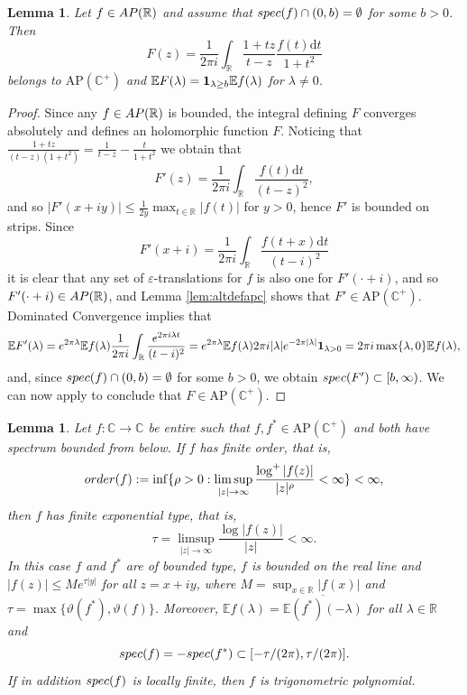 \documentclass[a4paper,reqno,12pt]{amsart}
\newtheorem{lemma}[theorem]{Lemma}
\newcommand{\E}{\mathcal{E}}
\renewcommand{\H}{\mathbb{C}^+}
\renewcommand{\r}{\mathbb{R}}
\newcommand{\cp}{\mathbb{C}} %
\newcommand{\la}{\lambda}
\newcommand{\ep}{\varepsilon}
\renewcommand{\d}{\mathrm{d}}
\newcommand{\1}{{\bf 1}}
\newcommand{\apc}{\mathrm{AP}(\H)}
\renewcommand{\E}{\mathbb{E}}
\newcommand{\ov}[1]{\overline{#1}}
\newcommand{\apr}{{\rm AP}(\r)}
\renewcommand{\1}{{\bo 1}}
\newcommand{\spec}{{\rm spec}}
\begin{document}
\begin{lemma}\label{lem:aprpoisson}
Let $f\in \apr$ and assume that $\spec(f)\cap (0,b)=\emptyset$ for some $b>0$. Then
$$
F(z)= \frac{1}{2\pi i} \int_\r \frac{1+tz}{t-z}\frac{f(t)\d t}{1+t^2} 
$$
belongs to $\apc$ and $\E F(\la)=\1_{\la\geq b}\E f(\la)$ for $\la \neq 0$.
\end{lemma}
\begin{proof}
Since any $f\in \apr$ is bounded, the integral defining $F$ converges absolutely and defines an holomorphic function $F$. Noticing that $\frac{1+tz}{(t-z)(1+t^2)} = \frac{1}{t-z} - \frac{t}{1+t^2}$ we obtain that
$$
F'(z) = \frac{1}{2\pi i} \int_\r \frac{f(t)\d t}{(t-z)^2},
$$
and so $|F'(x+iy)|\leq \frac{1}{2y}\max_{t\in \r} |f(t)|$ for $y>0$, hence $F'$ is bounded on strips. Since
$$
F'(x+i) = \frac{1}{2\pi i} \int_\r \frac{f(t+x)\d t}{(t-i)^2}
$$
it is clear that any set of $\ep$-translations for $f$ is also one for $F'(\cdot +i)$, and so $F'(\cdot +i) \in\apr$, and Lemma \ref{lem:altdefapc} shows that $F'\in \apc$. Dominated Convergence implies that
$$
\E F'(\la) = e^{2\pi \la} \E f(\la) \frac{1}{2\pi i} \int_\r  \frac{e^{2\pi i \la t}}{(t-i)^2} = e^{2\pi \la} \E f(\la) 2\pi i |\la| e^{-2\pi |\la|}\1_{\la>0} = 2 \pi i \max\{\la,0\}\E f(\la) ,
$$
and, since $\spec(f)\cap (0,b)=\emptyset$ for some $b>0$, we obtain $\spec(F')\subset [b,\infty)$. We can now apply \cite[Thm. 9, p. 152]{Be} to conclude that $F\in \apc$.
\end{proof}

\begin{lemma}\label{lem:order1apc}
Let $f: \cp\to\cp$ be entire such that $f, f^*\in \apc$ and both have spectrum bounded from below. If $f$ has finite order, that is,
$$
{\rm order}(f):= \inf \{\rho>0 : \limsup_{|z|\to\infty} \frac{\log^+ |f(z)|}{|z|^{\rho}} < \infty\} < \infty,
$$
then $f$ has finite exponential type, that is, 
$$
\tau=\limsup_{|z|\to\infty} \frac{\log |f(z)|}{|z|} < \infty.
$$
In this case $f$ and $f^*$ are of bounded type, $f$ is bounded on the real line and $|f(z)| \leq M e^{\tau|y|}$ for all $z=x+iy$, where $M=\sup_{x\in \r} |f(x)|$ and $\tau=\max\{\vartheta(f^*),\vartheta(f)\}$. Moreover,  $\E f(\la)=\ov{\E (f^*)(-\la)}$ for all $\la\in \r$ and 
$$
\spec(f)=-\spec(f^*)\subset [-\tau/(2\pi),\tau/(2\pi)].
$$
If in addition $\spec(f)$ is locally finite, then $f$ is trigonometric polynomial.
\end{lemma}
\end{document}
